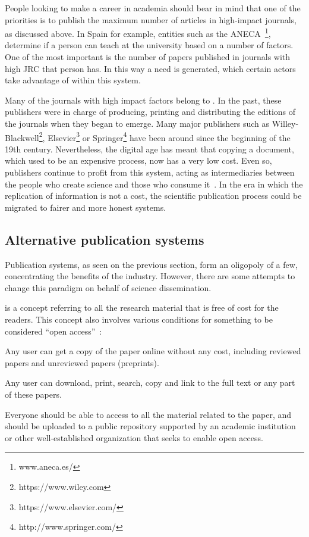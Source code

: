 People looking to make a career in academia should bear in mind that one of the
priorities is to publish the maximum number of articles in high-impact journals,
as discussed above. In Spain for example, entities such as the
ANECA~\footnote{www.aneca.es/}, determine if a person can teach at the
university based on a number of factors. One of the most important is the number
of papers published in journals with high JRC that person has. In this way a
need is generated, which certain actors take advantage of within this system.

Many of the journals with high impact factors belong to . In the
past, these publishers were in charge of producing, printing and distributing
the editions of the journals when they began to emerge. Many major publishers
such as Willey-Blackwell\footnote{https://www.wiley.com},
Elsevier\footnote{https://www.elsevier.com/} or
Springer\footnote{http://www.springer.com/} have been around since the beginning
of the 19th century. Nevertheless, the digital age has meant that copying a
document, which used to be an expensive process, now has a very low cost. Even
so, publishers continue to profit from this system, acting as intermediaries
between the people who create science and those who consume
it~\cite{lariviere2015oligopoly}. In the era in which the replication of
information is not a cost, the scientific publication process could be migrated
to fairer and more honest systems.

\subsection{Alternative publication systems}
\label{soa:aps}

Publication systems, as seen on the previous section, form an oligopoly of a
few, concentrating the benefits of the industry. However, there are some
attempts to change this paradigm on behalf of science dissemination.

 is a concept referring to all the research material that is
free of cost for the readers. This concept also involves various conditions for
something to be considered ``open access''~\cite{bailey2007open}:

\begin{itemize}
  
   Any user can get a copy of the paper online
  without any cost, including reviewed papers and unreviewed papers (preprints).
  
   Any user can download, print, search, copy and link to
  the full text or any part of these papers.

   Everyone should be able to access to all the material
  related to the paper, and should be uploaded to a public repository supported
  by an academic institution or other well-established organization that seeks
  to enable open access.
\end{itemize}


